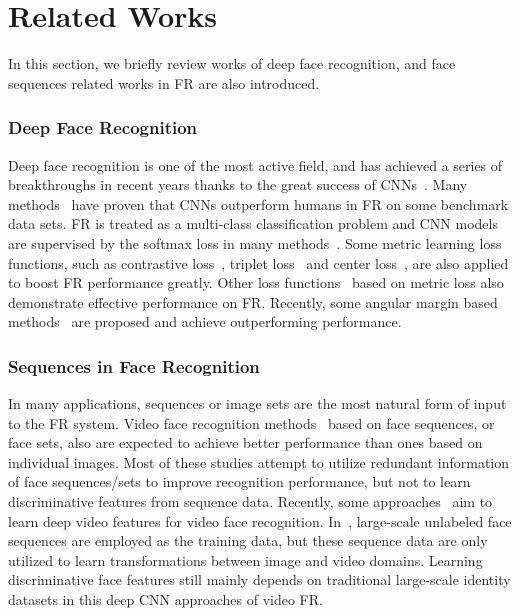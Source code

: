 \documentclass[conference]{acmsiggraph}
\begin{document}
\section{Related Works}
\label{sec:Related Works}
In this section, we briefly review works of deep face recognition, and face sequences related works in FR are also introduced.

\subsubsection{Deep Face Recognition}
Deep face recognition is one of the most active field, and has achieved a series of breakthroughs in recent years thanks to the great success of CNNs~\cite{resnet,cnn1,cnn2,cnn3}. Many methods~\cite{deepface,frbyclass1,frbyclass2,facenet,deepid2,deepid3,deepid2plus} have  proven that CNNs outperform humans in FR on some benchmark data sets. FR is treated as a multi-class classification problem and CNN models are supervised by the softmax loss in many methods~\cite{deepface,frbyclass1,frbyclass2}. Some metric learning loss functions, such as contrastive loss~\cite{casia,contrastiveloss}, triplet loss~\cite{tripletloss,facenet} and center loss~\cite{centerloss}, are also applied to boost FR performance greatly. Other loss functions~\cite{marginalloss,rangeloss} based on metric loss also demonstrate effective performance on FR. Recently, some angular margin based methods~\cite{lsoftmax,sphereface,arcface,cosface} are proposed and achieve outperforming performance. 

\subsubsection{Sequences in Face Recognition}
In many applications, sequences or image sets are the most natural form of input to the FR system. Video face recognition methods~\cite{facesequence1,facesequence2,facesequence3,videfr1,trunkcnn,coxface,haarnet,unlabeledvideo} based on face sequences, or face sets, also are expected to achieve better performance than ones based on individual images. Most of these studies attempt to utilize redundant information of face sequences/sets to improve recognition performance, but not to learn discriminative features from sequence data. Recently, some approaches~\cite{trunkcnn,haarnet,unlabeledvideo} aim to learn deep video features for video face recognition. In~\cite{unlabeledvideo}, large-scale unlabeled face sequences are employed as the training data, but these sequence data are only utilized to learn transformations between image and video domains. Learning discriminative face features still mainly depends on traditional large-scale identity datasets in this deep CNN approaches of video FR.
\end{document}
